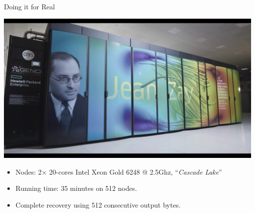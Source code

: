 \begin{frame}[label=bragging]{Doing it for Real}
  \begin{center}
    \includegraphics[width=0.7\linewidth]{pictures/Jean_Zay.jpg}
  \end{center}

  \begin{itemize}
    \item Nodes: 2$\times$ 20-cores \textsf{Intel Xeon Gold 6248 @ 2.5Ghz}, ``\emph{Cascade Lake}''
    \item Running time: 35 minutes on 512 nodes.
    \item Complete recovery using 512 consecutive output bytes.
    \end{itemize}
    
\end{frame}
